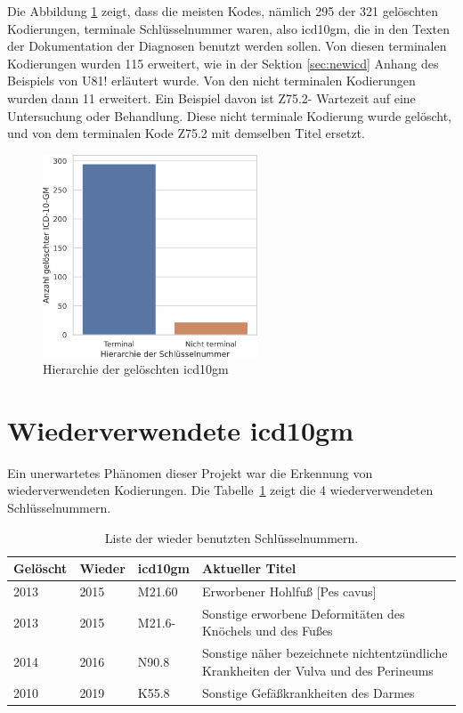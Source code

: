 Die Abbildung \ref{fig:oldicdort} zeigt, dass die meisten Kodes, nämlich 295 der 321 gelöschten Kodierungen, terminale Schlüsselnummer waren, also \ac{icd10gm}, die in den Texten der Dokumentation der Diagnosen benutzt werden sollen. Von diesen terminalen Kodierungen wurden 115 erweitert, wie in der Sektion \ref{sec:newicd} Anhang des Beispiels von \textsf{U81!} erläutert wurde. Von den nicht terminalen Kodierungen wurden dann 11 erweitert. Ein Beispiel davon ist \textsf{Z75.2-} \textsf{Wartezeit auf eine Untersuchung oder Behandlung}. Diese nicht terminale Kodierung wurde gelöscht, und von dem terminalen Kode \textsf{Z75.2} mit demselben Titel ersetzt. 


\begin{figure}[ht]
	\centering
	\includegraphics[height=6cm]{figures/ortoldYear}
	\caption{Hierarchie der gelöschten \acs{icd10gm}}
	\label{fig:oldicdort}
\end{figure}


\section{Wiederverwendete \acs{icd10gm}} \label{sec:delinicd}

Ein unerwartetes Phänomen dieser Projekt war die Erkennung von wiederverwendeten Kodierungen. Die Tabelle~\ref{tab:wieder} zeigt die 4 wiederverwendeten Schlüsselnummern.

\begin{table}[ht]
	\centering
	\small
	\caption[Wieder benutzte \acs{icd10gm}]{Liste der wieder benutzten Schlüsselnummern.}
	\label{tab:wieder}
	\begin{tabular}{|l|l|l|p{6cm}|}
		\hline
		\rowcolor{lightgray} Gelöscht & Wieder & \ac{icd10gm} & Aktueller Titel \\ \hline
		2013 & 2015 & M21.60 & Erworbener Hohlfuß [Pes cavus] \\ \hline
		2013 & 2015 & M21.6- & Sonstige erworbene Deformitäten des Knöchels und des Fußes \\ \hline
		2014 & 2016 & N90.8 & Sonstige näher bezeichnete nichtentzündliche Krankheiten der Vulva und des Perineums \\ \hline
		2010 & 2019 & K55.8 & Sonstige Gefäßkrankheiten des Darmes \\ \hline

\end{tabular}
\end{table}

